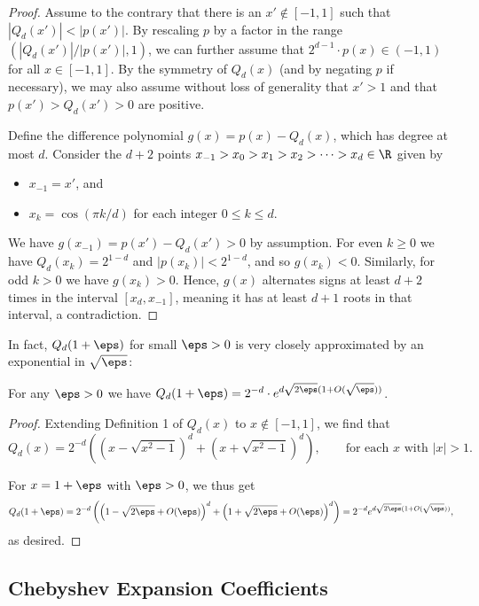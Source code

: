\begin{proof}
Assume to the contrary that there is an $x' \notin [-1,1]$ such that $|Q_d(x')| < |p(x')|$. By rescaling $p$ by a factor in the range $(|Q_d(x')|/|p(x')|,1)$, we can further assume that $2^{d-1} \cdot p(x) \in (-1,1)$ for all $x \in [-1,1]$. By the symmetry of $Q_d(x)$ (and by negating $p$ if necessary), we may also assume without loss of generality that $x'>1$ and that $p(x') > Q_d(x') > 0$ are positive.

Define the difference polynomial $g(x) = p(x) - Q_d(x)$, which has degree at most $d$. Consider the $d+2$ points $x_{-1} > x_0 > x_1 > x_2 > \cdots > x_{d} \in \R$ given by \begin{itemize}
    \item $x_{-1} = x'$, and
    \item $x_k = \cos\left( \pi k / d \right)$ for each integer $0 \leq k \leq d$.
\end{itemize}
We have $g(x_{-1}) = p(x') - Q_d(x') > 0$ by assumption. For even $k \geq 0$ we have $Q_d(x_k) = 2^{1-d}$ and $|p(x_k)| < 2^{1-d}$, and so $g(x_k) < 0$. Similarly, for odd $k>0$ we have $g(x_k) > 0$. Hence, $g(x)$ alternates signs at least $d+2$ times in the interval $[x_d, x_{-1}]$, meaning it has at least $d+1$ roots in that interval, a contradiction.
\end{proof}

In fact, $Q_d(1+\eps)$ for small $\eps>0$ is very closely approximated by an exponential in $\sqrt{\eps}$:

\begin{fact} \label{chebyasympt}
For any $\eps > 0$ we have $Q_d(1+\eps) = 2^{-d} \cdot e^{d \sqrt{2 \eps} (1+O(\sqrt{\eps}))}$. 
\end{fact}

\begin{proof}
Extending Definition 1 of $Q_d(x)$ to $x \notin [-1,1]$, we find that
$$Q_d(x) = 2^{-d} \left( \left( x - \sqrt{x^2 - 1} \right)^d +  \left( x + \sqrt{x^2 - 1} \right)^d  \right), \qquad \text{for each $x$ with $|x|>1$.}$$

\noindent For $x = 1+\eps$ with $\eps>0$, we thus get
$$Q_d(1+\eps) = 2^{-d} \left( \left( 1 - \sqrt{2\eps} + O(\eps) \right)^d +  \left( 1+\sqrt{2\eps } + O(\eps) \right)^d  \right) = 2^{-d} e^{d \sqrt{2 \eps} (1+O(\sqrt{\eps}))},$$
as desired.
\end{proof}


	\subsection{Chebyshev Expansion Coefficients}
	
